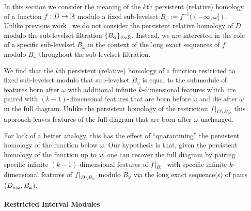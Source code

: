
In this section we consider the meaning of the $k$th persistent (relative) homology of a function $f : D\to \mathbb{R}$ modulo a fixed sub-levelset $B_\omega := f^{-1}((-\infty,\omega])$.
Unlike previous work~\cite{extendedpersistence} we do not consider the persistent relative homology of $D$ modulo the sub-levelset filtration $\{B_\alpha\}_{\alpha\in\mathbb{R}}$.
Instead, we are interested in the role of a specific sub-levelset $B_\omega$ in the context of the long exact sequences of $f$ modulo $B_\omega$ throughout the sub-levelset filtration.

We find that the $k$th persistent (relative) homology of a function restricted to fixed sub-levelset modulo that sub-levelset $B_\omega$ is equal to the submodule of features born after $\omega$ with additional infinite $k$-dimensional features which are paired with $(k-1)$-dimensonal features that are born before $\omega$ and die after $\omega$ in the full diagram.
Unlike the persistent homology of the restriction $f\mathord{\mid}_{D\setminus B_\omega}$ this approach leaves features of the full diagram that are born after $\omega$ unchanged.

For lack of a better analogy, this has the effect of ``quarantining'' the persistent homology of the function below $\omega$.
Our hypothesis is that, given the persistent homology of the function up to $\omega$, one can recover the full diagram by pairing specific infinite $(k-1)$-dimensional features of $f\mathord{\mid}_{B_\omega}$ with specific infinite $k$-dimensional features of $f\mathord{\mid}_{D\setminus B_\omega}$ modulo $B_\omega$ via the long exact sequence(s) of pairs $(D_{\scriptscriptstyle \alpha\mid \omega}, B_\omega)$.

\paragraph{Restricted Interval Modules}

